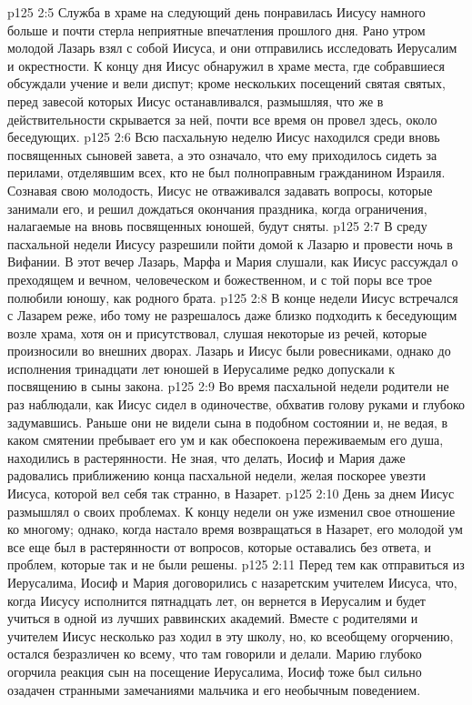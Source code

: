 \vs p125 2:5 Служба в храме на следующий день понравилась Иисусу намного больше и почти стерла неприятные впечатления прошлого дня. Рано утром молодой Лазарь взял с собой Иисуса, и они отправились исследовать Иерусалим и окрестности. К концу дня Иисус обнаружил в храме места, где собравшиеся обсуждали учение и вели диспут; кроме нескольких посещений святая святых, перед завесой которых Иисус останавливался, размышляя, что же в действительности скрывается за ней, почти все время он провел здесь, около беседующих.
\vs p125 2:6 Всю пасхальную неделю Иисус находился среди вновь посвященных сыновей завета, а это означало, что ему приходилось сидеть за перилами, отделявшим всех, кто не был полноправным гражданином Израиля. Сознавая свою молодость, Иисус не отваживался задавать вопросы, которые занимали его, и решил дождаться окончания праздника, когда ограничения, налагаемые на вновь посвященных юношей, будут сняты.
\vs p125 2:7 В среду пасхальной недели Иисусу разрешили пойти домой к Лазарю и провести ночь в Вифании. В этот вечер Лазарь, Марфа и Мария слушали, как Иисус рассуждал о преходящем и вечном, человеческом и божественном, и с той поры все трое полюбили юношу, как родного брата.
\vs p125 2:8 В конце недели Иисус встречался с Лазарем реже, ибо тому не разрешалось даже близко подходить к беседующим возле храма, хотя он и присутствовал, слушая некоторые из речей, которые произносили во внешних дворах. Лазарь и Иисус были ровесниками, однако до исполнения тринадцати лет юношей в Иерусалиме редко допускали к посвящению в сыны закона.
\vs p125 2:9 Во время пасхальной недели родители не раз наблюдали, как Иисус сидел в одиночестве, обхватив голову руками и глубоко задумавшись. Раньше они не видели сына в подобном состоянии и, не ведая, в каком смятении пребывает его ум и как обеспокоена переживаемым его душа, находились в растерянности. Не зная, что делать, Иосиф и Мария даже радовались приближению конца пасхальной недели, желая поскорее увезти Иисуса, которой вел себя так странно, в Назарет.
\vs p125 2:10 День за днем Иисус размышлял о своих проблемах. К концу недели он уже изменил свое отношение ко многому; однако, когда настало время возвращаться в Назарет, его молодой ум все еще был в растерянности от вопросов, которые оставались без ответа, и проблем, которые так и не были решены.
\vs p125 2:11 Перед тем как отправиться из Иерусалима, Иосиф и Мария договорились с назаретским учителем Иисуса, что, когда Иисусу исполнится пятнадцать лет, он вернется в Иерусалим и будет учиться в одной из лучших раввинских академий. Вместе с родителями и учителем Иисус несколько раз ходил в эту школу, но, ко всеобщему огорчению, остался безразличен ко всему, что там говорили и делали. Марию глубоко огорчила реакция сын на посещение Иерусалима, Иосиф тоже был сильно озадачен странными замечаниями мальчика и его необычным поведением.
